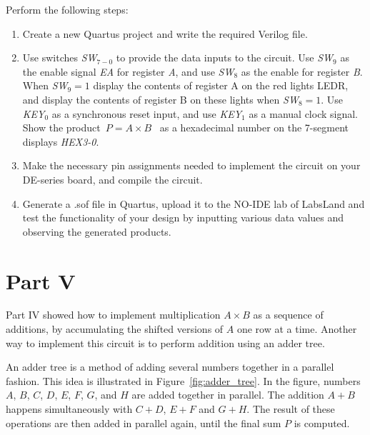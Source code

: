 \documentclass[epsfig,10pt,fullpage]{article}
\begin{document}
Perform the following steps:
\begin{enumerate}
\item Create a new Quartus project and write the required Verilog file.
\item Use switches {\it SW}$_{7-0}$ to provide the data inputs to the circuit. Use
{\it SW}$_9$ as the enable signal {\it EA} for register {\it A}, and use {\it SW}$_8$
as the enable for register {\it B}.  When {\it SW}$_9 = 1$ display the contents of
register A on the red lights LEDR, and display the contents of register B on these lights
when {\it SW}$_8 = 1$. Use {\it KEY}$_0$ as a synchronous reset input, and use 
{\it KEY}$_1$ as a manual clock signal.  Show the product~$P = A \times B$~ as a
hexadecimal number on the 7-segment displays {\it HEX3-0}.
\item Make the necessary pin assignments needed to implement the circuit on your
DE-series board, and compile the circuit.
\item Generate a .sof file in Quartus, upload it to the NO-IDE lab of LabsLand and test the functionality of your design by inputting various data values and observing
the generated products.
\end{enumerate}

\section*{Part V}
Part IV showed how to implement multiplication $A \times B$ as a sequence of additions, 
by accumulating the shifted versions of $A$ one row at a time. Another way to implement 
this circuit is to perform addition using an adder tree.

An adder tree is a method of adding several numbers together in a parallel fashion. This 
idea is illustrated in Figure~\ref{fig:adder_tree}. In the figure, numbers 
$A$, $B$, $C$, $D$, $E$, $F$, $G$, and $H$ are added together in parallel.
The addition $A + B$ happens simultaneously with $C + D$, $E + F$ and $G + H$. The 
result of these operations are then added in parallel
again, until the final sum $P$ is computed.
\end{document}
